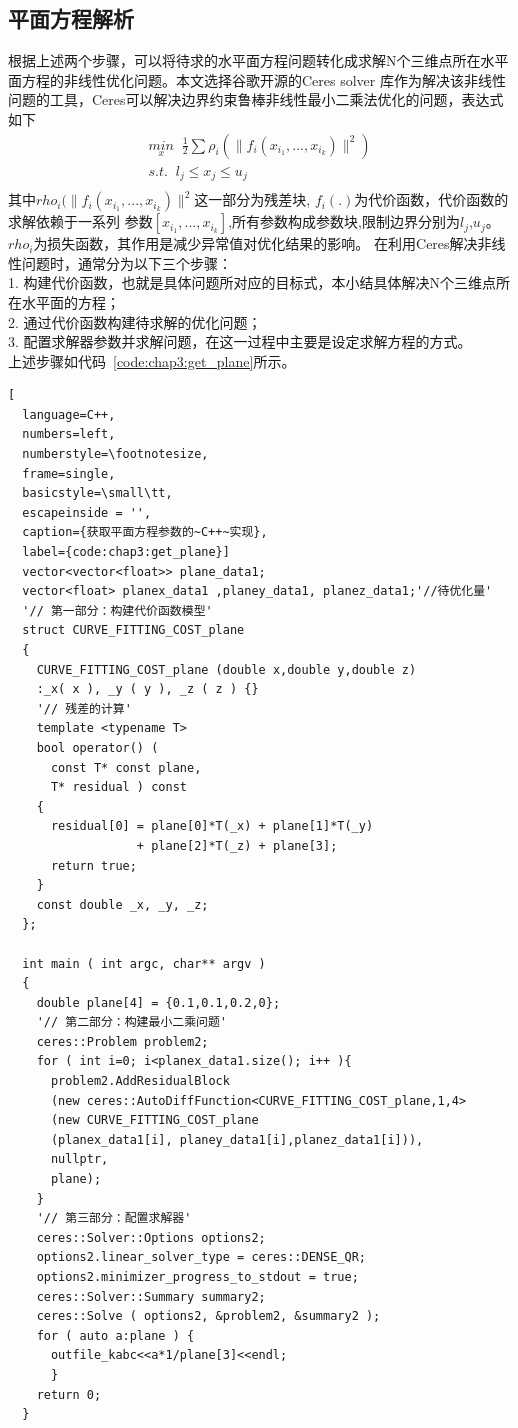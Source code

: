 \subsection{平面方程解析}
根据上述两个步骤，可以将待求的水平面方程问题转化成求解N个三维点所在水平面方程的非线性优化问题。本文选择谷歌开源的Ceres solver
库作为解决该非线性问题的工具，Ceres可以解决边界约束鲁棒非线性最小二乘法优化的问题，表达式如下
\begin{equation}
\begin{array}{l}\underset x{min}\;\;\frac12\sum\rho_i(\parallel f_i(x_{i_1},...,x_{i_k})\parallel^2)
\\s.t.\;\;l_j\leq x_j\leq u_j\\\end{array}
\end{equation}
其中$rho_i(\parallel f_i(x_{i_1},...,x_{i_k})\parallel^2$这一部分为残差块, $f_i(.)$为代价函数，代价函数的求解依赖于一系列
参数$[x_{i_1},...,x_{i_k}]$,所有参数构成参数块,限制边界分别为$l_j$,$u_j$。$rho_i$为损失函数，其作用是减少异常值对优化结果的影响。
在利用Ceres解决非线性问题时，通常分为以下三个步骤：\\
1.	构建代价函数，也就是具体问题所对应的目标式，本小结具体解决N个三维点所在水平面的方程；\\
2.	通过代价函数构建待求解的优化问题；\\
3.	配置求解器参数并求解问题，在这一过程中主要是设定求解方程的方式。\\
上述步骤如代码~\ref{code:chap3:get_plane}所示。
\begin{lstlisting}[
  language=C++,
  numbers=left,                
  numberstyle=\footnotesize,
  frame=single,     
  basicstyle=\small\tt,    
  escapeinside = '',
  caption={获取平面方程参数的~C++~实现},
  label={code:chap3:get_plane}]
  vector<vector<float>> plane_data1;
  vector<float> planex_data1 ,planey_data1, planez_data1;'//待优化量'
  '// 第一部分：构建代价函数模型'
  struct CURVE_FITTING_COST_plane
  {
    CURVE_FITTING_COST_plane (double x,double y,double z)
    :_x( x ), _y ( y ), _z ( z ) {}
    '// 残差的计算'
    template <typename T>
    bool operator() (
      const T* const plane,    
      T* residual ) const 
    {
      residual[0] = plane[0]*T(_x) + plane[1]*T(_y) 
                  + plane[2]*T(_z) + plane[3]; 
      return true;
    }
    const double _x, _y, _z;
  };

  int main ( int argc, char** argv )
  {   
    double plane[4] = {0.1,0.1,0.2,0};
    '// 第二部分：构建最小二乘问题'
    ceres::Problem problem2;
    for ( int i=0; i<planex_data1.size(); i++ ){
      problem2.AddResidualBlock 
      (new ceres::AutoDiffFunction<CURVE_FITTING_COST_plane,1,4> 
      (new CURVE_FITTING_COST_plane 
      (planex_data1[i], planey_data1[i],planez_data1[i])),
      nullptr,
      plane);
    }
    '// 第三部分：配置求解器'
    ceres::Solver::Options options2;    
    options2.linear_solver_type = ceres::DENSE_QR;
    options2.minimizer_progress_to_stdout = true; 
    ceres::Solver::Summary summary2;                 
    ceres::Solve ( options2, &problem2, &summary2 );
    for ( auto a:plane ) {
      outfile_kabc<<a*1/plane[3]<<endl;
      }
    return 0;
  }
\end{lstlisting}

